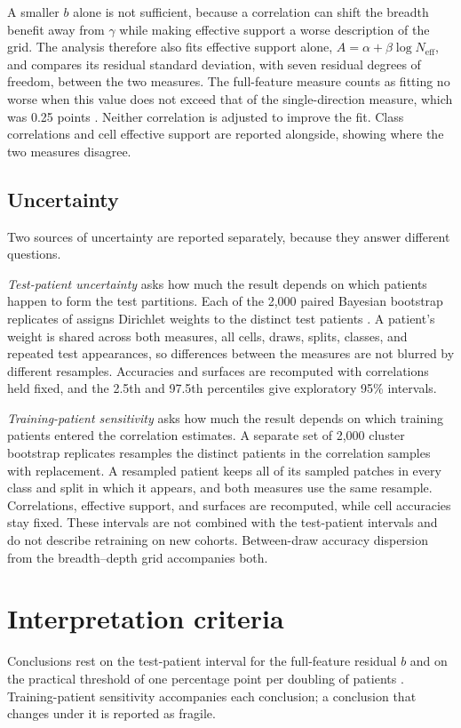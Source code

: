 \documentclass[11pt]{article}
\newcommand{\Neff}{N_{\mathrm{eff}}}
\begin{document}
A smaller $b$ alone is not sufficient, because a correlation can shift the breadth benefit away from $\gamma$ while making effective support a worse description of the grid. The analysis therefore also fits effective support alone, $A=\alpha+\beta\log\Neff$, and compares its residual standard deviation, with seven residual degrees of freedom, between the two measures. The full-feature measure counts as fitting no worse when this value does not exceed that of the single-direction measure, which was 0.25 points \citep{queisler2026effectiveSupport}. Neither correlation is adjusted to improve the fit. Class correlations and cell effective support are reported alongside, showing where the two measures disagree.

\subsection{Uncertainty}
\label{sec:uncertainty}
Two sources of uncertainty are reported separately, because they answer different questions.

\emph{Test-patient uncertainty} asks how much the result depends on which patients happen to form the test partitions. Each of the 2,000 paired Bayesian bootstrap replicates of \citet{queisler2026effectiveSupport} assigns Dirichlet weights to the distinct test patients \citep{rubin1981bayesian}. A patient's weight is shared across both measures, all cells, draws, splits, classes, and repeated test appearances, so differences between the measures are not blurred by different resamples. Accuracies and surfaces are recomputed with correlations held fixed, and the 2.5th and 97.5th percentiles give exploratory 95\% intervals.

\emph{Training-patient sensitivity} asks how much the result depends on which training patients entered the correlation estimates. A separate set of 2,000 cluster bootstrap replicates resamples the distinct patients in the correlation samples with replacement. A resampled patient keeps all of its sampled patches in every class and split in which it appears, and both measures use the same resample. Correlations, effective support, and surfaces are recomputed, while cell accuracies stay fixed. These intervals are not combined with the test-patient intervals and do not describe retraining on new cohorts. Between-draw accuracy dispersion from the breadth--depth grid accompanies both.

\section{Interpretation criteria}
\label{sec:interpretation}
Conclusions rest on the test-patient interval for the full-feature residual $b$ and on the practical threshold of one percentage point per doubling of patients \citep{queisler2026effectiveSupport}. Training-patient sensitivity accompanies each conclusion; a conclusion that changes under it is reported as fragile.
\end{document}
